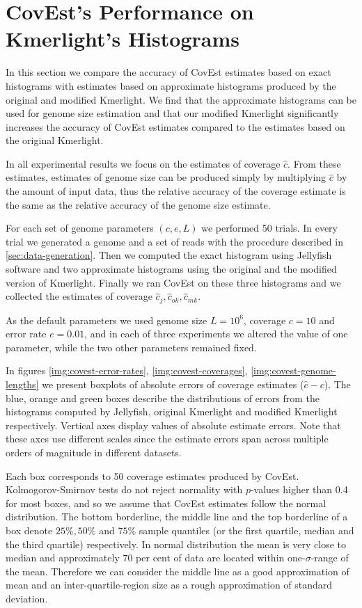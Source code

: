 \section{CovEst's Performance on Kmerlight's Histograms}
In this section we compare the accuracy of CovEst estimates based on exact histograms
with estimates based on approximate histograms produced by the original and modified Kmerlight.
We find that the approximate histograms can be used for genome size estimation and that
our modified Kmerlight significantly increases the accuracy of CovEst estimates compared to
the estimates based on the original Kmerlight.

In all experimental results we focus on the estimates of coverage $\hat c$. From these estimates,
estimates of genome size can be produced simply by multiplying $\hat c$ by the amount of input
data, thus the relative accuracy of the coverage estimate is the same as the relative accuracy of 
the genome size estimate.

For each set of genome parameters $(c, e, L)$ we performed 50 trials.
In every trial we generated a genome and a set of reads with the procedure described
in \ref{sec:data-generation}. Then we computed the exact histogram using Jellyfish software
\cite{Marcais2011}
and two approximate histograms using the original and the modified version of Kmerlight.
Finally we ran CovEst on these three histograms and we collected the estimates of coverage
$\hat c_j, \hat c_{ok}, \hat c_{mk}$. 

As the default parameters we used genome size $L=10^6$, coverage $c=10$ and error rate $e=0.01$,
and in each of three experiments we altered the value of one parameter, while the two other parameters
remained fixed. 

In figures \ref{img:covest-error-rates}, \ref{img:covest-coverages}, 
\ref{img:covest-genome-lengths} we present boxplots of absolute errors of coverage estimates
($\hat c - c$). The blue, orange and green boxes describe the distributions of errors
from the histograms computed by Jellyfish, original Kmerlight and modified Kmerlight respectively.
Vertical axes display values of absolute estimate errors. Note that these axes use different
scales since the estimate errors span across multiple orders of magnitude in different datasets.

Each box corresponds to 50 coverage estimates produced by CovEst. Kolmogorov-Smirnov tests do not
reject normality with $p$-values higher than 0.4 for most boxes, and so we assume that CovEst
estimates follow the normal distribution. The bottom borderline, the middle line 
and the top borderline of a box denote $25\%, 50\%$ and $75\%$ sample quantiles (or 
the first quartile, median and the third quartile) respectively. In normal distribution the mean is
very close to median and approximately $70$ per cent of data are located within one-$\sigma$-range 
of the mean. Therefore we can consider the middle line as a good approximation of mean and 
an inter-quartile-region size as a rough approximation of standard deviation.    

